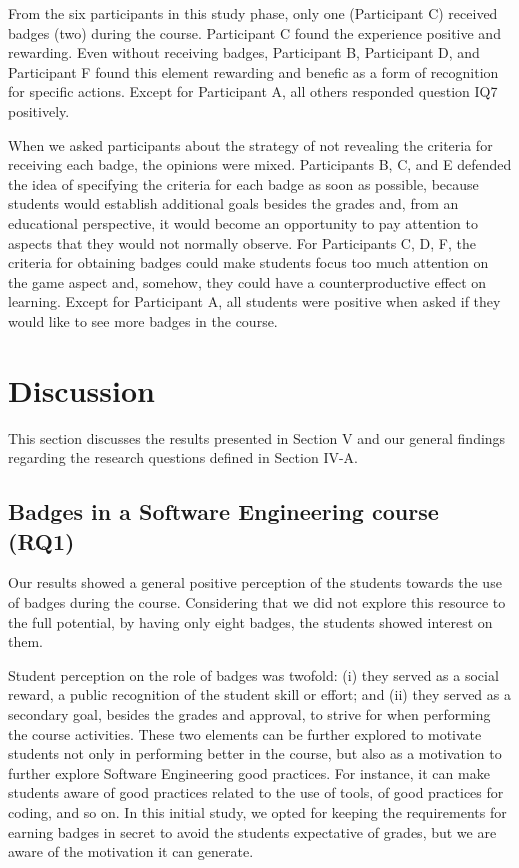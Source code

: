 From the six participants in this study phase, only one (Participant C) received badges (two) during the course. Participant C found the experience positive and rewarding. Even without receiving badges, Participant B, Participant D, and Participant F found this element rewarding and benefic as a form of recognition for specific actions. Except for Participant A, all others responded question IQ7 positively.

When we asked participants about the strategy of not revealing the criteria for receiving each badge, the opinions were mixed. Participants B, C, and E defended the idea of specifying the criteria for each badge as soon as possible, because students would establish additional goals besides the grades and, from an educational perspective, it would become an opportunity to pay attention to aspects that they would not normally observe. For Participants C, D, F, the criteria for obtaining badges could make students focus too much attention on the game aspect and, somehow, they could have a counterproductive effect on learning. Except for Participant A, all students were positive when asked if they would like to see more badges in the course.

\section{Discussion}

This section discusses the results presented in Section V and our general findings regarding the research questions defined in Section IV-A.

\subsection{Badges in a Software Engineering course (RQ1)}

Our results showed a general positive perception of the students towards the use of badges during the course. Considering that we did not explore this resource to the full potential, by having only eight badges, the students showed interest on them.

Student perception on the role of badges was twofold: (i) they served as a social reward, a public recognition of the student skill or effort; and (ii) they served as a secondary goal, besides the grades and approval, to strive for when performing the course activities. These two elements can be further explored to motivate students not only in performing better in the course, but also as a motivation to further explore Software Engineering good practices. For instance, it can make students aware of good practices related to the use of tools, of good practices for coding, and so on. In this initial study, we opted for keeping the requirements for earning badges in secret to avoid the students expectative of grades, but we are aware of the motivation it can generate.

